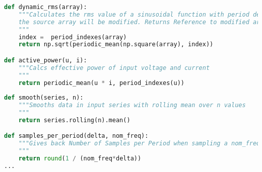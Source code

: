 \begin{lstlisting}[language=python, caption=Auszug aus \texttt{preprocessData.py}, label=lst:PreprocessData,frame=single,framerule=0pt]
def dynamic_rms(array):
    """Calculates the rms value of a sinusoidal function with period detection by zero crossing **in place**, that means,
    the source array will be modified. Returns Reference to modified array.
    """
    index =  period_indexes(array)
    return np.sqrt(periodic_mean(np.square(array), index))

def active_power(u, i):
    """Calcs effective power of input voltage and current
    """
    return periodic_mean(u * i, period_indexes(u))
    
def smooth(series, n):
    """Smooths data in input series with rolling mean over n values
    """
    return series.rolling(n).mean()

def samples_per_period(delta, nom_freq):
    """Gives back Number of Samples per Period when sampling a nom_freq signal with delta 
    """
    return round(1 / (nom_freq*delta))
...
\end{lstlisting}

